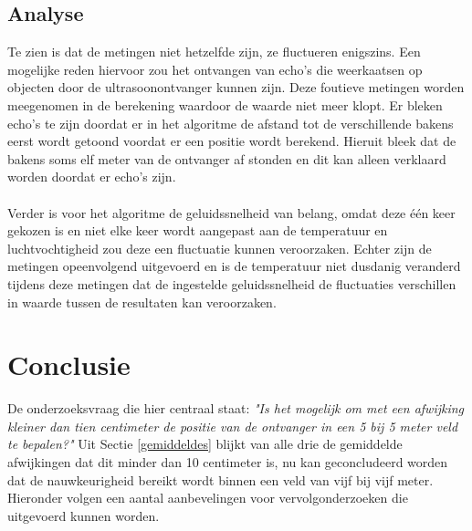 \documentclass{article}
\begin{document}
\subsection{Analyse}
Te zien is dat de metingen niet hetzelfde zijn, ze fluctueren enigszins. Een mogelijke reden hiervoor zou 
het ontvangen van echo's die weerkaatsen op objecten door de ultrasoonontvanger kunnen zijn. Deze foutieve metingen worden meegenomen in de berekening waardoor de waarde niet meer klopt. Er bleken echo's te zijn doordat er in het algoritme de afstand tot de verschillende bakens eerst wordt getoond voordat er een positie wordt berekend. Hieruit bleek dat de bakens soms elf meter van de ontvanger af stonden en dit kan alleen verklaard worden doordat er echo's zijn.\\
\\
Verder is voor het algoritme de geluidssnelheid van belang, omdat deze \'{e}\'{e}n keer gekozen is en niet elke keer wordt aangepast aan de temperatuur en luchtvochtigheid zou deze een fluctuatie kunnen veroorzaken. Echter zijn de metingen opeenvolgend uitgevoerd en is de temperatuur niet dusdanig veranderd tijdens deze metingen dat de ingestelde geluidssnelheid de fluctuaties verschillen in waarde tussen de resultaten kan veroorzaken.

\section{Conclusie}
 De onderzoeksvraag die hier centraal staat: \textit{"Is het mogelijk om met een afwijking kleiner dan tien centimeter de positie van de ontvanger in een 5 bij 5 meter veld te bepalen?"} Uit Sectie \ref{gemiddeldes} blijkt van alle drie de gemiddelde afwijkingen dat dit minder dan 10 centimeter is, nu kan geconcludeerd worden dat de nauwkeurigheid bereikt wordt binnen een veld van vijf bij vijf meter. Hieronder volgen een aantal aanbevelingen voor vervolgonderzoeken die uitgevoerd kunnen worden. 
\end{document}
